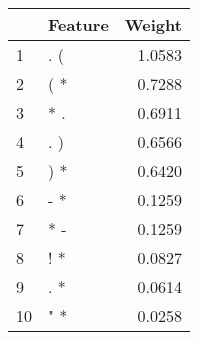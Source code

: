 \begin{tabular}{llr}
\toprule
{} & Feature &  Weight \\
\midrule
1  &     . ( &  1.0583 \\
2  &     ( * &  0.7288 \\
3  &     * . &  0.6911 \\
4  &     . ) &  0.6566 \\
5  &     ) * &  0.6420 \\
6  &     - * &  0.1259 \\
7  &     * - &  0.1259 \\
8  &     ! * &  0.0827 \\
9  &     . * &  0.0614 \\
10 &     " * &  0.0258 \\
\bottomrule
\end{tabular}
